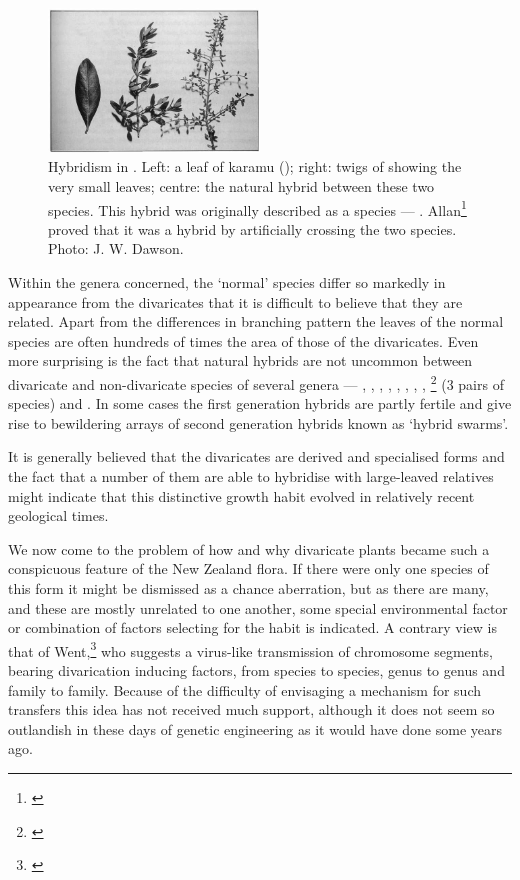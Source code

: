 \begin{figure}
	\includegraphics[width=0.5\textwidth]{graphics/figure80coprosma.jpg}
	\centering
	\caption[Hybridism in Coprosma]{Hybridism in .
	Left: a leaf of karamu (); right: twigs of  showing the very small leaves; centre: the natural hybrid between these two species.
	This hybrid was originally described as a species --- .
	Allan\footnote{\cite{cockayne1912observations}} proved that it was a hybrid by artificially crossing the two species.
	Photo:  J. W. Dawson.}%
	\label{fig:80coprosma}
\end{figure}

Within the genera concerned, the `normal' species differ so markedly in appearance from the divaricates that it is difficult to believe that they are related.
Apart from the differences in branching pattern the leaves of the normal species are often hundreds of times the area of those of the divaricates.
Even more surprising is the fact that natural hybrids are not uncommon between divaricate and non-divaricate species of several genera --- , , , , , , , , \footnote{\cite{allan1924hybridity}} (3 pairs of species) and .
In some cases the first generation hybrids are partly fertile and give rise to bewildering arrays of second generation hybrids known as `hybrid swarms'.

It is generally believed that the divaricates are derived and specialised forms and the fact that a number of them are able to hybridise with large-leaved relatives might indicate that this distinctive growth habit evolved in relatively recent geological times.

We now come to the problem of how and why divaricate plants became such a conspicuous feature of the New Zealand flora.
If there were only one species of this form it might be dismissed as a chance aberration, but as there are many, and these are mostly unrelated to one another, some special environmental factor or combination of factors selecting for the habit is indicated.
A contrary view is that of Went,\footnote{\cite{went1971parallel}} who suggests a virus-like transmission of chromosome segments, bearing divarication inducing factors, from species to species, genus to genus and family to family.
Because of the difficulty of envisaging a mechanism for such transfers this idea has not received much support, although it does not seem so outlandish in these days of genetic engineering as it would have done some years ago.

